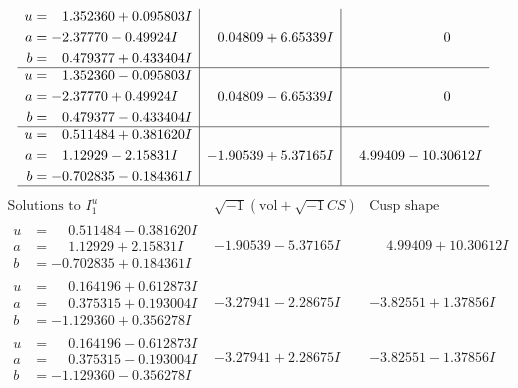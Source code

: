 \documentclass[1p]{elsarticle_modified}
\theoremstyle{definition}
\newcommand{\I}{\sqrt{-1}}
\begin{document}
$$\begin{array}{c|c|c}
\begin{aligned}
u &= \phantom{-}1.352360 + 0.095803 I \\
a &= -2.37770 - 0.49924 I \\
b &= \phantom{-}0.479377 + 0.433404 I\end{aligned}
 & \phantom{-}0.04809 + 6.65339 I & \phantom{-0.000000 } 0 \\ \hline\begin{aligned}
u &= \phantom{-}1.352360 - 0.095803 I \\
a &= -2.37770 + 0.49924 I \\
b &= \phantom{-}0.479377 - 0.433404 I\end{aligned}
 & \phantom{-}0.04809 - 6.65339 I & \phantom{-0.000000 } 0 \\ \hline\begin{aligned}
u &= \phantom{-}0.511484 + 0.381620 I \\
a &= \phantom{-}1.12929 - 2.15831 I \\
b &= -0.702835 - 0.184361 I\end{aligned}
 & -1.90539 + 5.37165 I & \phantom{-}4.99409 - 10.30612 I\\
 \hline 
 \end{array}$$\newpage$$\begin{array}{c|c|c}  
\text{Solutions to }I^u_{1}& \I (\text{vol} + \sqrt{-1}CS) & \text{Cusp shape}\\
 \hline 
\begin{aligned}
u &= \phantom{-}0.511484 - 0.381620 I \\
a &= \phantom{-}1.12929 + 2.15831 I \\
b &= -0.702835 + 0.184361 I\end{aligned}
 & -1.90539 - 5.37165 I & \phantom{-}4.99409 + 10.30612 I \\ \hline\begin{aligned}
u &= \phantom{-}0.164196 + 0.612873 I \\
a &= \phantom{-}0.375315 + 0.193004 I \\
b &= -1.129360 + 0.356278 I\end{aligned}
 & -3.27941 - 2.28675 I & -3.82551 + 1.37856 I \\ \hline\begin{aligned}
u &= \phantom{-}0.164196 - 0.612873 I \\
a &= \phantom{-}0.375315 - 0.193004 I \\
b &= -1.129360 - 0.356278 I\end{aligned}
 & -3.27941 + 2.28675 I & -3.82551 - 1.37856 I \\ \hline\begin{aligned}

\end{aligned}
\end{array}$$
\end{document}
